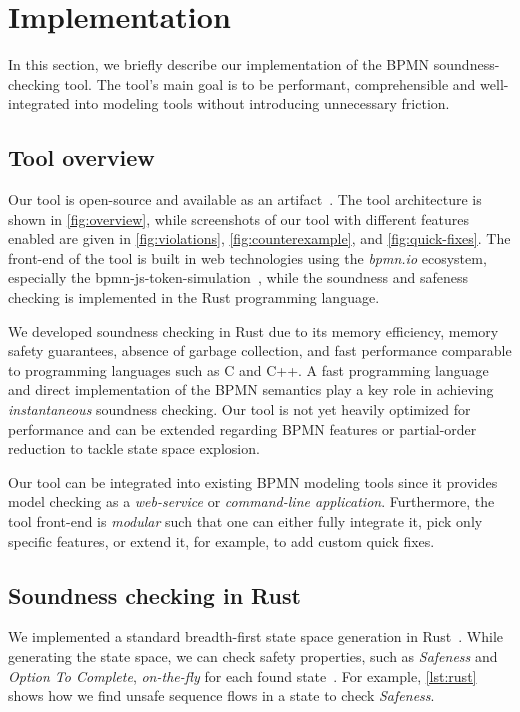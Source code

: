 \documentclass[runningheads]{llncs}
\begin{document}
\section{Implementation} \label{sec:impl}

In this section, we briefly describe our implementation of the BPMN soundness-checking tool.
The tool's main goal is to be performant, comprehensible and well-integrated into modeling tools without introducing unnecessary friction.

\subsection{Tool overview}
Our tool is open-source and available as an artifact~\cite{noauthorgivenBPM2024Artifacts2024}.
The tool architecture is shown in \autoref{fig:overview}, while screenshots of our tool with different features enabled are given in \autoref{fig:violations}, \autoref{fig:counterexample}, and \autoref{fig:quick-fixes}.
The front-end of the tool is built in web technologies using the \textit{bpmn.io} ecosystem, especially the bpmn-js-token-simulation~\cite{camundaservicesgmbhBpmnjsTokenSimulation2024}, while the soundness and safeness checking is implemented in the Rust programming language.

We developed soundness checking in Rust due to its memory efficiency, memory safety guarantees, absence of garbage collection, and fast performance comparable to programming languages such as C and C++.
A fast programming language and direct implementation of the BPMN semantics play a key role in achieving \textit{instantaneous} soundness checking.
Our tool is not yet heavily optimized for performance and can be extended regarding BPMN features or partial-order reduction to tackle state space explosion.

Our tool can be integrated into existing BPMN modeling tools since it provides model checking as a \textit{web-service} or \textit{command-line application}.
Furthermore, the tool front-end is \textit{modular} such that one can either fully integrate it, pick only specific features, or extend it, for example, to add custom quick fixes.

\subsection{Soundness checking in Rust}
We implemented a standard breadth-first state space generation in Rust~\cite{clarkeHandbookModelChecking2018}.
While generating the state space, we can check safety properties, such as \textit{Safeness} and \textit{Option To Complete}, \textit{on-the-fly} for each found state~\cite{clarkeHandbookModelChecking2018}.
For example, \autoref{lst:rust} shows how we find unsafe sequence flows in a state to check \textit{Safeness}.
\end{document}
